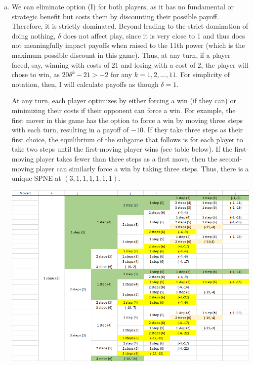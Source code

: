 \documentclass{article}
\begin{document}
\begin{enumerate}[(a)]
	\item We can eliminate option (I) for both players, as it has no fundamental or strategic benefit but costs them by discounting their possible payoff. Therefore, it is strictly dominated. Beyond leading to the strict domination of doing nothing, $\delta$ does not affect play, since it is very close to 1 and thus does not meaningfully impact payoffs when raised to the 11th power (which is the maximum possible discount in this game). Thus, at any turn, if a player faced, say, winning with costs of 21 and losing with a cost of 2, the player will chose to win, as ${20\delta^k-21>-2}$ for any ${k=1,2,...,11}$. For simplicity of notation, then, I will calculate payoffs as though ${\delta=1}$.
	
	At any turn, each player optimizes by either forcing a win (if they can) or minimizing their costs if their opponent can force a win. For example, the first mover in this game has the option to force a win by moving three steps with each turn, resulting in a payoff of $-10$. If they take three steps as their first choice, the equilibrium of the subgame that follows is for each player to take two steps until the first-moving player wins (see table below). If the first-moving player takes fewer than three steps as a first move, then the second-moving player can similarly force a win by taking three steps. Thus, there is a unique SPNE at $(3,1,1,1,1,1,1)$.
		\begin{center}
			\includegraphics[scale=.5]{table4a.png}
		\end{center}
	

\end{enumerate}
\end{document}
